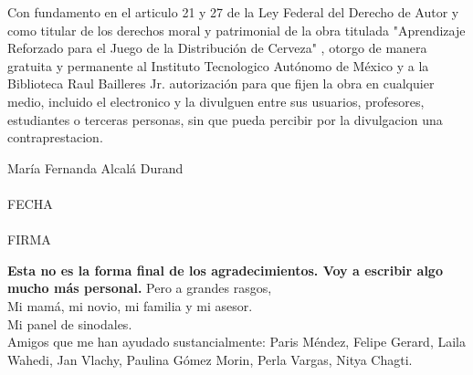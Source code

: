 
\newpage
\mbox{}
\thispagestyle{empty} %

\newpage
\thispagestyle{empty}
Con fundamento en el art\´iculo 21 y 27 de la Ley Federal del Derecho de Autor y como titular de los derechos moral y patrimonial de la obra titulada "Aprendizaje Reforzado para el Juego de la Distribuci\'on de Cerveza" , otorgo de manera gratuita y permanente al Instituto Tecnol\´ogico Autónomo de México y a la Biblioteca Ra\´ul Baill\´eres Jr. autorización para que fijen la obra en cualquier medio, incluido el electr\´onico y la divulguen entre sus usuarios, profesores, estudiantes o terceras personas, sin que pueda percibir por la divulgaci\´on una contraprestaci\´on.

\vspace{20 mm}
\begin{center}
Mar\'ia Fernanda Alcal\'a Durand\\

\vspace{20 mm}
\makebox[2in]{\hrulefill}\\
FECHA\\
\vspace{20 mm}
\makebox[2in]{\hrulefill}\\
FIRMA
\end{center}

\newpage
\mbox{}
\thispagestyle{empty} %



\textbf{Esta no es la forma final de los agradecimientos. Voy a escribir algo mucho m\'as personal.} Pero a grandes rasgos, \\

Mi mam\'a, mi novio, mi familia y mi asesor.\\

Mi panel de sinodales.\\

Amigos que me han ayudado sustancialmente: Paris M\'endez, Felipe Gerard, Laila Wahedi, Jan Vlachy, Paulina G\'omez Morin, Perla Vargas, Nitya Chagti.

\newpage
\mbox{}
\thispagestyle{empty} %
